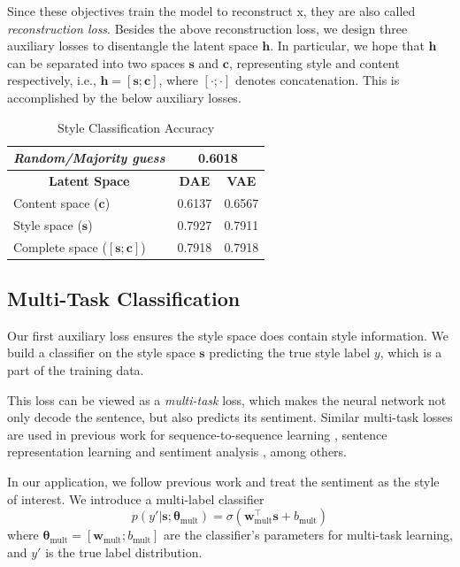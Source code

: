 \documentclass[11pt,a4paper]{article}
\newcommand{\rmx}{\mathrm x}
\newcommand{\tabh}[1]{\multicolumn{1}{c|}{\textbf{#1}}}
\newcommand{\tabc}[2]{\multicolumn{1}{|c|}{\multirow{#1}{*}{\textbf{#2}}}}
\begin{document}
Since these objectives train the model to reconstruct $\rmx$, they are also called \textit{reconstruction loss}. Besides the above reconstruction loss, we design three auxiliary losses to disentangle the latent space $\bm h$. In particular, we hope that $\bm h$ can be separated into two spaces $\bm s$ and $\bm c$, representing style and content respectively, i.e., $\bm h = [\bm s ; \bm c]$, where $[\cdot;\cdot]$ denotes concatenation. This is accomplished by the below auxiliary losses.

\begin{table}[ht]
	\centering
	\begin{tabular}{| l | r | r |}
		\hline
		\textit{Random/Majority guess}   & \multicolumn{2}{c|}{0.6018}              \\ \hline \hline
		\hline
		\tabc{1}{Latent Space}           & \tabh{DAE}                  & \tabh{VAE} \\
		\hline \hline
		Content space  ($\bm c$)         & 0.6137                      & 0.6567     \\ \hline
		Style space ($\bm s$)            & 0.7927                      & 0.7911     \\ \hline
		Complete space ($[\bm s;\bm c]$) & 0.7918                      & 0.7918     \\
		\hline
	\end{tabular}
	\caption{Style Classification Accuracy}
	\label{tab:classification}
\end{table}

\subsection{Multi-Task Classification} \label{ssec:multitask-classification-objective}

Our first auxiliary loss ensures the style space does contain style information. We build a classifier on the style space $\bm s$ predicting the true style label $y$, which is a part of the training data.

This loss can be viewed as a \textit{multi-task} loss, which makes the neural network not only decode the sentence, but also predicts its sentiment. Similar multi-task losses are used in previous work for sequence-to-sequence learning \cite{luong2015multi}, sentence representation learning \cite{jernite2017discourse} and sentiment analysis \cite{balikas2017multitask}, among others.

In our application, we follow previous work \cite{hu2017toward,shen2017style,fu2017style} and treat the sentiment as the style of interest. We introduce a multi-label classifier
\begin{equation} \label{eqn:class-pred}
	p(y' | \bm s; \bm\theta_\text{mult}) = \sigma(\bm w_\text{mult}^\top \bm s + b_\text{mult})
\end{equation}
where $\bm\theta_\text{mult}=[\bm w_\text{mult}; b_\text{mult}]$ are the classifier's parameters for multi-task learning, and $y'$ is the true label distribution.
\end{document}
